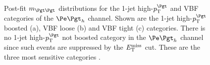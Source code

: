 \begin{figure}[tbh]

\caption[Post-fit $m_{\Pgt\Pgt}$ distributions for the 1-jet high-$\pt^{\Pgt}$ and VBF 
categories of the $\etau$ channel.]{Post-fit $m_{\Pgt\Pgt}$ distributions for
the 1-jet high-$\pt^{\Pgt}$ and VBF categories of the $\etau$ channel. Shown
are the 1-jet high-$\pt^{\Pgt}$ boosted (a), VBF loose (b) and VBF tight (c) categories. There
is no 1-jet high-$\pt^{\Pgt}$ not boosted category in the $\etau$ channel since
such events are suppressed by the $E_{\mathrm{T}}^{\text{miss}}$ cut. These
are the three most sensitive categories \cite{HIG-13-004}.}
\label{fig:postfit1jetvbfetau}
\end{figure}

